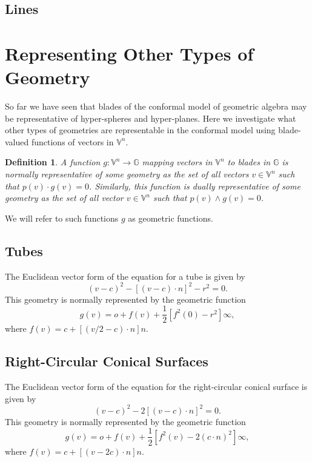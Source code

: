 \documentclass{article}
\newcommand{\V}{\mathbb{V}}
\newcommand{\G}{\mathbb{G}}
\newcommand{\nvao}{o}
\newcommand{\nvai}{\infty}
\newtheorem{definition}{Definition}[section]
\begin{document}
\subsection{Lines}

\section{Representing Other Types of Geometry}

So far we have seen that blades of the conformal model of geometric algebra
may be representative of hyper-spheres and hyper-planes.  Here we investigate
what other types of geometries are representable in the conformal model using
blade-valued functions of vectors in $\V^n$.

\begin{definition}
A function $g:\V^n\to\G$ mapping vectors in $\V^n$ to blades in $\G$ is
normally representative of some geometry as the set of all vectors $v\in\V^n$
such that $p(v)\cdot g(v)=0$.  Similarly, this function is dually representative
of some geometry as the set of all vector $v\in\V^n$ such that $p(v)\wedge g(v)=0$.
\end{definition}
We will refer to such functions $g$ as geometric functions.

\subsection{Tubes}

The Euclidean vector form of the equation for a tube is given by
\begin{equation*}
(v-c)^2-[(v-c)\cdot n]^2-r^2 = 0.
\end{equation*}
This geometry is normally represented by the geometric function
\begin{equation*}
g(v)=\nvao+f(v)+\frac{1}{2}[f^2(0)-r^2]\nvai,
\end{equation*}
where $f(v)=c+[(v/2-c)\cdot n]n$.

\subsection{Right-Circular Conical Surfaces}

The Euclidean vector form of the equation for the right-circular conical surface is given by
\begin{equation*}
(v-c)^2-2[(v-c)\cdot n]^2=0.
\end{equation*}
This geometry is normally represented by the geometric function
\begin{equation*}
g(v)=\nvao+f(v)+\frac{1}{2}[f^2(v)-2(c\cdot n)^2]\nvai,
\end{equation*}
where $f(v)=c+[(v-2c)\cdot n]n$.
\end{document}
